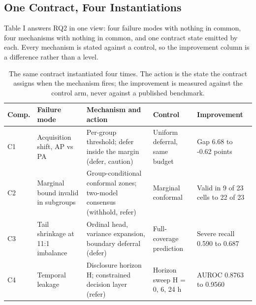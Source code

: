 \documentclass[conference,a4paper]{IEEEtran}
\newlength{\tblw}
\begin{document}
\subsection{One Contract, Four Instantiations}
Table I answers RQ2 in one view: four failure modes with nothing in common, four mechanisms with nothing in common, and one contract state emitted by each. Every mechanism is stated against a control, so the improvement column is a difference rather than a level.

\begin{table}[!t]
\caption{The same contract instantiated four times. The action is the state the contract assigns when the mechanism fires; the improvement is measured against the control arm, never against a published benchmark.}
\label{tab:1}
\centering
\setlength{\tabcolsep}{3pt}
\setlength{\tblw}{\dimexpr\columnwidth-10\tabcolsep\relax}
\footnotesize
\begin{tabular}{|>{\raggedright\arraybackslash}p{0.080\tblw}|>{\raggedright\arraybackslash}p{0.200\tblw}|>{\raggedright\arraybackslash}p{0.320\tblw}|>{\raggedright\arraybackslash}p{0.180\tblw}|>{\raggedright\arraybackslash}p{0.220\tblw}|}
\hline
\textbf{Comp.} & \textbf{Failure mode} & \textbf{Mechanism and action} & \textbf{Control} & \textbf{Improvement} \\
\hline
C1 & Acquisition shift, AP vs PA & Per-group threshold; defer inside the margin (defer, caution) & Uniform deferral, same budget & Gap 6.68 to -0.62 points \\
\hline
C2 & Marginal bound invalid in subgroups & Group-conditional conformal zones; two-model consensus (withhold, refer) & Marginal conformal & Valid in 9 of 23 cells to 22 of 23 \\
\hline
C3 & Tail shrinkage at 11:1 imbalance & Ordinal head, variance expansion, boundary deferral (defer) & Full-coverage prediction & Severe recall 0.590 to 0.687 \\
\hline
C4 & Temporal leakage & Disclosure horizon H; constrained decision layer (refer) & Horizon sweep H = 0, 6, 24 h & AUROC 0.8763 to 0.9560 \\
\hline
\end{tabular}
\end{table}
\end{document}
